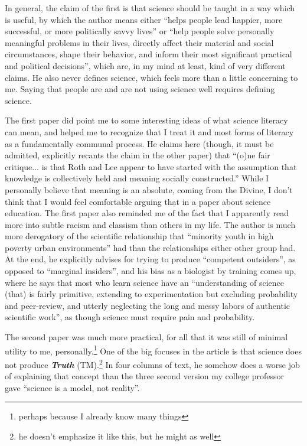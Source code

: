\documentclass[12pt]{article}
\newcommand{\say}[1]{``#1''}
\renewcommand{\,}{\textsuperscript{,}}
\begin{document}
In general, the claim of the first is that science should be taught in a way which is useful, by which the author means either \say{helps people lead happier, more successful, or more politically savvy lives} or \say{help people solve personally meaningful problems in their lives, directly affect their material and social circumstances, shape their behavior, and inform their most significant practical and political decisions}, which are, in my mind at least, kind of very different claims.  
He also never defines science, which feels more than a little concerning to me.  
Saying that people are and are not using science well requires defining science.

The first paper did point me to some interesting ideas of what science literacy can mean, and helped me to recognize that I treat it and most forms of literacy as a fundamentally communal process.  
He claims here (though, it must be admitted, explicitly recants the claim in the other paper) that \say{(o)ne fair critique... is that Roth and Lee appear to have started with the assumption that knowledge is collectively held and meaning socially constructed.}  
While I personally believe that meaning is an absolute, coming from the Divine, I don't think that I would feel comfortable arguing that in a paper about science education.  
The first paper also reminded me of the fact that I apparently read more into subtle racism and classism than others in my life.  
The author is much more derogatory of the scientific relationship that \say{minority youth in high poverty urban environments} had than the relationships either other group had.  
At the end, he explicitly advises for trying to produce \say{competent outsiders}, as opposed to \say{marginal insiders}, and his bias as a biologist by training comes up, where he says that most who learn science have an \say{understanding of science (that) is fairly primitive, extending to experimentation but excluding probability and peer-review, and utterly neglecting the long and messy labors of authentic scientific work}, as though science must require pain and probability.

The second paper was much more practical, for all that it was still of minimal utility to me, personally.\footnote{perhaps because I already know many things}  
One of the big focuses in the article is that science does not produce \textbf{\textit{Truth}} (TM).\footnote{he doesn't emphasize it like this, but he might as well}  
In four columns of text, he somehow does a worse job of explaining that concept than the three second version my college professor gave \say{science is a model, not reality}.
\end{document}
